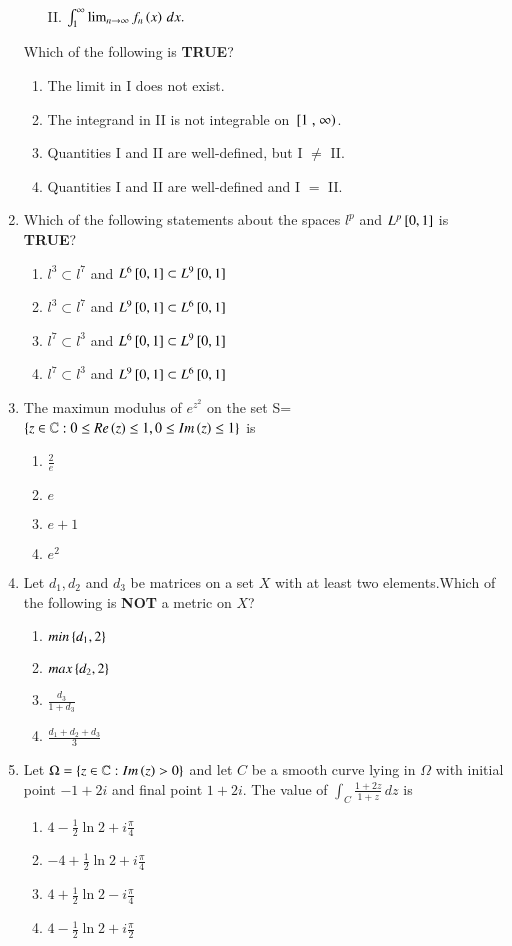 \documentclass[journal]{IEEEtran}
\begin{document}
\begin{enumerate}
\begin{enumerate}
    \item[II.] $\int_1^\infty \lim_{n \to \infty} f_n\left(x\right) \, dx.$
\end{enumerate}
Which of the following is \textbf{TRUE}?
\begin{enumerate}
    \item The limit in I does not exist.
    \item The integrand in II is not integrable on ${}\left[1\right., \left.\infty\right)$.
    \item Quantities I and II are well-defined, but I $\neq$ II.
    \item Quantities I and II are well-defined and I $=$ II.
\end{enumerate}
\item Which of the following statements about the spaces $l^p$ and $L^p{}\left[0,1\right]$ is \textbf{TRUE}?
\begin{enumerate}
    \item $l^3 \subset l^7$ and $L^6{}\left[0,1\right] \subset L^9{}\left[0,1\right]$
    \item $l^3 \subset l^7$ and $L^9{}\left[0,1\right] \subset L^6{}\left[0,1\right]$
    \item $l^7 \subset l^3$ and $L^6{}\left[0,1\right] \subset L^9{}\left[0,1\right]$
    \item $l^7 \subset l^3$ and $L^9{}\left[0,1\right] \subset L^6{}\left[0,1\right]$
\end{enumerate}
\item The maximun modulus of $e^{z^2}$ on the set S=$\left\{ z \in \mathbb{C} : 0 \leq Re\left(z\right) \leq 1, 0 \leq Im\left(z\right) \leq 1\right\}$ is
\begin{enumerate}
    \item $\frac{2}{e}$
    \item $e$
    \item $e+1$
    \item $e^2$
\end{enumerate}
\item Let $d_1,d_2$ and $d_3$ be matrices on a set $X$ with at least two elements.Which of the following is \textbf{NOT} a metric on $X$?
\begin{enumerate}
    \item $min\left\{d_1,2\right\}$
    \item $max\left\{d_2,2\right\}$
    \item $\frac{d_3}{1+d_3}$
    \item $\frac{d_1+d_2+d_3}{3}$
\end{enumerate}
\item Let $\Omega = \left\{ z \in \mathbb{C} : Im\left(z\right) > 0 \right\}$ and let $C$ be a smooth curve lying in $\Omega$ with initial point $-1 + 2i$ and final point $1 + 2i$. The value of $\int_C \frac{1 + 2z}{1 + z} \, dz$ is
\begin{enumerate}
    \item $4 - \frac{1}{2} \ln 2 + i \frac{\pi}{4}$
    \item $-4 + \frac{1}{2} \ln 2 + i \frac{\pi}{4}$
    \item $4 + \frac{1}{2} \ln 2 - i \frac{\pi}{4}$
    \item $4 - \frac{1}{2} \ln 2 + i \frac{\pi}{2}$
\end{enumerate}
\end{enumerate}

\end{document}
